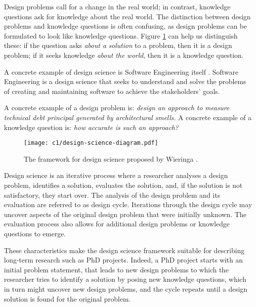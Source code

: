 Design problems call for a change in the real world; in contrast, knowledge questions ask for knowledge about the real world.
The distinction between design problems and knowledge questions is often confusing, as design problems can be formulated to look like knowledge questions.
Figure \ref{fig:design-science} can help us distinguish these: if the question asks  \emph{about a solution} to a problem, then it is a design problem; if it seeks knowledge \emph{about the world}, then it is a knowledge question.

A concrete example of design science is Software Engineering itself \cite{Wieringa2014}.
Software Engineering is a design science that seeks to understand and solve the problems of creating and maintaining software to achieve the stakeholders' goals.

A concrete example of a design problem is: \emph{design an approach to measure technical debt principal generated by architectural smells.}
A concrete example of a knowledge question is: \emph{how accurate is such an approach?}

\begin{figure}
    \centering
    \texttt{[image: c1/design-science-diagram.pdf]}
    \caption{The framework for design science proposed by Wieringa \cite{Wieringa2014}.}\label{fig:design-science}
\end{figure}

Design science is an iterative process where a researcher analyses a design problem, identifies a solution, evaluates the solution, and, if the solution is not satisfactory, they start over. 
The analysis of the design problem and its evaluation are referred to as design cycle.
Iterations through the design cycle may uncover aspects of the original design problem that were initially unknown.
The evaluation process also allows for additional design problems or knowledge questions to emerge.

These characteristics make the design science framework suitable for describing long-term research such as PhD projects.
Indeed, a PhD project starts with an initial problem statement, that leads to new design problems to which the researcher tries to identify a solution by posing new knowledge questions, which in turn might uncover new design problems, and the cycle repeats until a design solution is found for the original problem.

